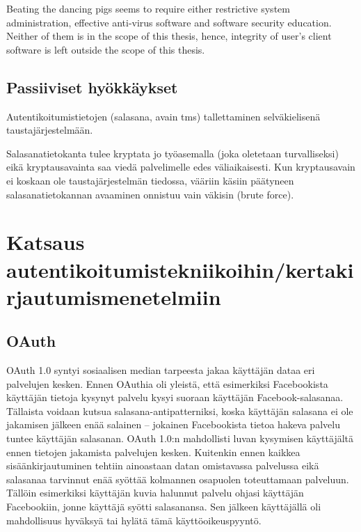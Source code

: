\documentclass[english,gradu]{tktltiki}
\begin{document}
              Beating the dancing pigs \cite{schneier_secrets_and_lies_2000} seems to require either restrictive system administration, effective anti-virus software and software security education. Neither of them is in the scope of this thesis, hence, integrity of user's client software is left outside the scope of this thesis.



\subsection{Passiiviset hyökkäykset} %
\label{sub:passiiviset_hyökkäykset}

Autentikoitumistietojen (salasana, avain tms) tallettaminen selväkielisenä taustajärjestelmään.

Salasanatietokanta tulee kryptata jo työasemalla (joka oletetaan turvalliseksi) eikä kryptausavainta saa viedä palvelimelle edes väliaikaisesti.
Kun kryptausavain ei koskaan ole taustajärjestelmän tiedossa, vääriin käsiin päätyneen salasanatietokannan avaaminen onnistuu vain väkisin (brute force).



\section{Katsaus autentikoitumistekniikoihin/kertakirjautumismenetelmiin} %
\label{sec:katsaus_autentikoitumistekniikoihin_kertakirjautumismenetelmiin}


\subsection{OAuth} %
\label{sub:oaauth_auktorisointimenetelmä}

OAuth 1.0 syntyi sosiaalisen median tarpeesta jakaa käyttäjän dataa eri palvelujen kesken. Ennen OAuthia oli yleistä, että esimerkiksi Facebookista käyttäjän tietoja kysynyt palvelu kysyi suoraan käyttäjän Facebook-salasanaa. Tällaista voidaan kutsua salasana-antipatterniksi, koska käyttäjän salasana ei ole jakamisen jälkeen enää salainen -- jokainen Facebookista tietoa hakeva palvelu tuntee käyttäjän salasanan. OAuth 1.0:n mahdollisti luvan kysymisen käyttäjältä ennen tietojen jakamista palvelujen kesken. Kuitenkin ennen kaikkea sisäänkirjautuminen tehtiin ainoastaan datan omistavassa palvelussa eikä salasanaa tarvinnut enää syöttää kolmannen osapuolen toteuttamaan palveluun. Tällöin esimerkiksi käyttäjän kuvia halunnut palvelu ohjasi käyttäjän Facebookiin, jonne käyttäjä syötti salasanansa. Sen jälkeen käyttäjällä oli mahdollisuus hyväksyä tai hylätä tämä käyttöoikeuspyyntö.
\end{document}

